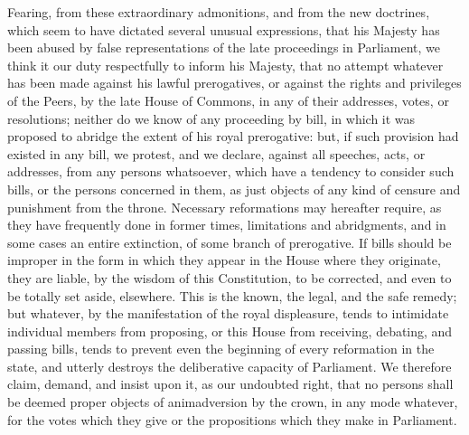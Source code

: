 Fearing, from these extraordinary admonitions, and from the new doctrines, which seem to have dictated several unusual expressions, that his Majesty has been abused by false representations of the late proceedings in Parliament, we think it our duty respectfully to inform his Majesty, that no attempt whatever has been made against his lawful prerogatives, or against the rights and privileges of the Peers, by the late House of Commons, in any of their addresses, votes, or resolutions; neither do we know of any proceeding by bill, in which it was proposed to abridge the extent of his royal prerogative: but, if such provision had existed in any bill, we protest, and we declare, against all speeches, acts, or addresses, from any persons whatsoever, which have a tendency to consider such bills, or the persons concerned in them, as just objects of any kind of censure and punishment from the throne. Necessary reformations may hereafter require, as they have frequently done in former times, limitations and abridgments, and in some cases an entire extinction, of some branch of prerogative. If bills should be improper in the form in which they appear in the House where they originate, they are liable, by the wisdom of this Constitution, to be corrected, and even to be totally set aside, elsewhere. This is the known, the legal, and the safe remedy; but whatever, by the manifestation of the royal displeasure, tends to intimidate individual members from proposing, or this House from receiving, debating, and passing bills, tends to prevent even the beginning of every reformation in the state, and utterly destroys the deliberative capacity of Parliament. We therefore claim, demand, and insist upon it, as our undoubted right, that no persons shall be deemed proper objects of animadversion by the crown, in any mode whatever, for the votes which they give or the propositions which they make in Parliament.

